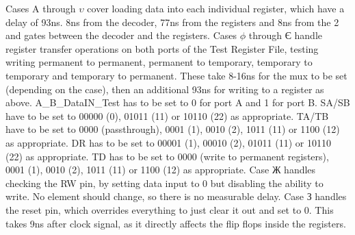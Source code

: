 \documentclass{article}
\begin{document}
\author{Kyara McWilliam 23375183}
\hfill \break \break
Cases A through $\upsilon$ cover loading data into each individual register, which have a delay of 93ns. 8ns from the decoder, 77ns from the registers and 8ns from the 2 and gates between the decoder and the registers.
\hfill \break \break
Cases $\phi$ through Є handle register transfer operations on both ports of the Test Register File, testing writing permanent to permanent, permanent to temporary, temporary to temporary and temporary to permanent. These take 8-16ns for the mux to be set (depending on the case), then an additional 93ns for writing to a register as above.
\hfill \break
A\_B\_DataIN\_Test has to be set to 0 for port A and 1 for port B.\hfill \break
SA/SB have to be set to 00000 (0), 01011 (11) or 10110 (22) as appropriate. \hfill \break
TA/TB have to be set to 0000 (passthrough), 0001 (1), 0010 (2), 1011 (11) or 1100 (12) as appropriate. \hfill \break
DR has to be set to 00001 (1), 00010 (2), 01011 (11) or 10110 (22) as appropriate. \hfill \break 
TD has to be set to 0000 (write to permanent registers), 0001 (1), 0010 (2), 1011 (11) or 1100 (12) as appropriate.
\hfill \break \break
Case Ж handles checking the RW pin, by setting data input to 0 but disabling the ability to write. No element should change, so there is no measurable delay.
\hfill \break \break
Case З handles the reset pin, which overrides everything to just clear it out and set to 0. This takes 9ns after clock signal, as it directly affects the flip flops inside the registers.
\end{document}

